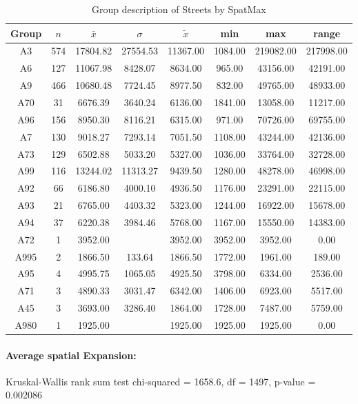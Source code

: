 \documentclass[a4paper,headsepline,footsepline,fontsize=11pt,BCOR=12mm,DIV=12]{report}
\begin{document}
\begin{table}[h]
	\small
	\centering
	\begin{tabular}{c|c|c|c|c|c|c|c}
		\toprule
		Group & $n$ & $\bar{x}$ & $\sigma$ & $\tilde{x}$ & min & max & range \\ 
		\midrule
		A3 & 574 & 17804.82 & 27554.53 & 11367.00 & 1084.00 & 219082.00 & 217998.00 \\ 
		A6 & 127 & 11067.98 & 8428.07 & 8634.00  & 965.00 & 43156.00 & 42191.00 \\ 
		A9 & 466 & 10680.48 & 7724.45 & 8977.50 & 832.00 & 49765.00 & 48933.00 \\ 
		A70 & 31 & 6676.39 & 3640.24 & 6136.00 & 1841.00 & 13058.00 & 11217.00 \\ 
		A96 & 156 & 8950.30 & 8116.21 & 6315.00 & 971.00 & 70726.00 & 69755.00 \\ 
		A7 & 130 & 9018.27 & 7293.14 & 7051.50 & 1108.00 & 43244.00 & 42136.00 \\ 
		A73 & 129 & 6502.88 & 5033.20 & 5327.00 & 1036.00 & 33764.00 & 32728.00 \\ 
		A99 & 116 & 13244.02 & 11313.27 & 9439.50 & 1280.00 & 48278.00 & 46998.00 \\ 
		A92 & 66 & 6186.80 & 4000.10 & 4936.50 & 1176.00 & 23291.00 & 22115.00 \\ 
		A93 & 21 & 6765.00 & 4403.32 & 5323.00 & 1244.00 & 16922.00 & 15678.00 \\ 
		A94 & 37 & 6220.38 & 3984.46 & 5768.00 & 1167.00 & 15550.00 & 14383.00 \\ 
		A72 & 1 & 3952.00 &  & 3952.00 & 3952.00 & 3952.00 & 0.00 \\ 
		A995 & 2 & 1866.50 & 133.64 & 1866.50 & 1772.00 & 1961.00 & 189.00 \\ 
		A95 & 4 & 4995.75 & 1065.05 & 4925.50 & 3798.00 & 6334.00 & 2536.00 \\ 
		A71 & 3 & 4890.33 & 3031.47 & 6342.00 & 1406.00 & 6923.00 & 5517.00 \\ 
		A45 & 3 & 3693.00 & 3286.40 & 1864.00 & 1728.00 & 7487.00 & 5759.00 \\ 
		A980 & 1 & 1925.00 &  & 1925.00 & 1925.00 & 1925.00 & 0.00 \\ 
		\bottomrule
	\end{tabular}
	\caption{Group description of Streets by SpatMax}
\end{table}

\paragraph{Average spatial Expansion:}
Kruskal-Wallis rank sum test chi-squared = 1658.6, df = 1497, p-value = 0.002086
\end{document}
